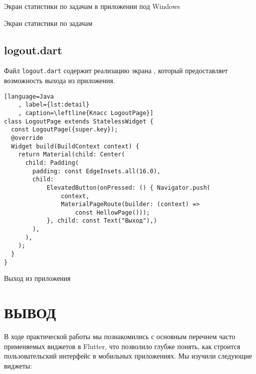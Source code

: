 \clearpage

Экран статистики по задачам в приложении под Windows 

\begin{image}
	\caption{Экран статистики по задачам}
	\label{fig:stats}
\end{image}

\clearpage


\subsection{logout.dart}

Файл \texttt{logout.dart} 
содержит реализацию экрана ,
который предоставляет возможность выхода из приложения.

\begin{lstlisting}[language=Java
	, label={lst:detail}
	, caption=\leftline{Класс LogoutPage}]
class LogoutPage extends StatelessWidget {
  const LogoutPage({super.key});
  @override
  Widget build(BuildContext context) {
    return Material(child: Center(
      child: Padding(
        padding: const EdgeInsets.all(16.0),
        child:
            ElevatedButton(onPressed: () { Navigator.push(
                context,
                MaterialPageRoute(builder: (context) =>
                    const HellowPage()));
            }, child: const Text("Выход"),)
        ),
      ),
    );
  }
}
\end{lstlisting}

\begin{image}
	\caption{Выход из приложения}
	\label{fig:detail}
\end{image}

\clearpage

\section*{ВЫВОД}

В ходе практической работы мы познакомились
с основным перечнем часто применяемых виджетов в Flutter,
что позволило глубже понять,
как строится пользовательский интерфейс в мобильных приложениях.
Мы изучили следующие виджеты:


